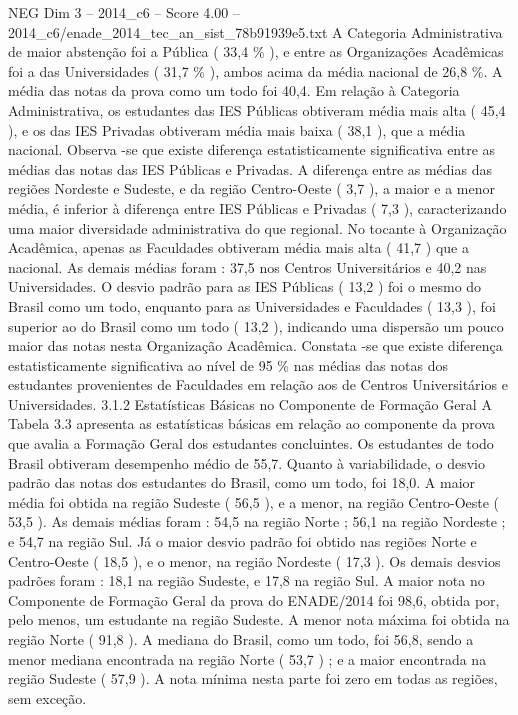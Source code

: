 \begin{textsample}{NEG Dim 3 – 2014\_c6 – Score 4.00 – 2014\_c6/enade\_2014\_tec\_an\_sist\_78b91939e5.txt}
A Categoria Administrativa de maior abstenção foi a Pública ( 33,4 \% ), e entre as Organizações Acadêmicas foi a das Universidades ( 31,7 \% ), ambos acima da média nacional de 26,8 \%.
A média das notas da prova como um todo foi 40,4.
Em relação à Categoria Administrativa, os estudantes das IES Públicas obtiveram média mais alta ( 45,4 ), e os das IES Privadas obtiveram média mais baixa ( 38,1 ), que a média nacional.
Observa -se que existe diferença estatisticamente significativa entre as médias das notas das IES Públicas e Privadas.
A diferença entre as médias das regiões Nordeste e Sudeste, e da região Centro-Oeste ( 3,7 ), a maior e a menor média, é inferior à diferença entre IES Públicas e Privadas ( 7,3 ), caracterizando uma maior diversidade administrativa do que regional.
No tocante à Organização Acadêmica, apenas as Faculdades obtiveram média mais alta ( 41,7 ) que a nacional.
As demais médias foram : 37,5 nos Centros Universitários e 40,2 nas Universidades.
O desvio padrão para as IES Públicas ( 13,2 ) foi o mesmo do Brasil como um todo, enquanto para as Universidades e Faculdades ( 13,3 ), foi superior ao do Brasil como um todo ( 13,2 ), indicando uma dispersão um pouco maior das notas nesta Organização Acadêmica.
Constata -se que existe diferença estatisticamente significativa ao nível de 95 \% nas médias das notas dos estudantes provenientes de Faculdades em relação aos de Centros Universitários e Universidades. 3.1.2 Estatísticas Básicas no Componente de Formação Geral A Tabela 3.3 apresenta as estatísticas básicas em relação ao componente da prova que avalia a Formação Geral dos estudantes concluintes.
Os estudantes de todo Brasil obtiveram desempenho médio de 55,7.
Quanto à variabilidade, o desvio padrão das notas dos estudantes do Brasil, como um todo, foi 18,0.
A maior média foi obtida na região Sudeste ( 56,5 ), e a menor, na região Centro-Oeste ( 53,5 ).
As demais médias foram : 54,5 na região Norte ; 56,1 na região Nordeste ; e 54,7 na região Sul.
Já o maior desvio padrão foi obtido nas regiões Norte e Centro-Oeste ( 18,5 ), e o menor, na região Nordeste ( 17,3 ).
Os demais desvios padrões foram : 18,1 na região Sudeste, e 17,8 na região Sul.
A maior nota no Componente de Formação Geral da prova do ENADE/2014 foi 98,6, obtida por, pelo menos, um estudante na região Sudeste.
A menor nota máxima foi obtida na região Norte ( 91,8 ).
A mediana do Brasil, como um todo, foi 56,8, sendo a menor mediana encontrada na região Norte ( 53,7 ) ; e a maior encontrada na região Sudeste ( 57,9 ).
A nota mínima nesta parte foi zero em todas as regiões, sem exceção.

\end{textsample}
